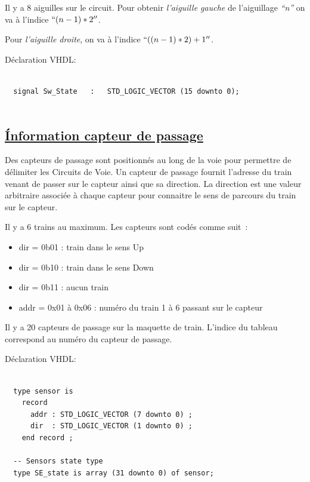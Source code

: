 \medskip

Il y a 8 aiguilles sur le circuit. Pour obtenir \emph{l'aiguille gauche} de
l'aiguillage \emph{``n''} on va à l'indice $``(n-1)*2''$.

Pour \emph{l'aiguille droite}, on va à l'indice $``((n-1)*2) + 1''$.

\bigskip

Déclaration VHDL:
\begin{lstlisting}[style=vhdl]

  signal Sw_State   :   STD_LOGIC_VECTOR (15 downto 0);
  
\end{lstlisting}


\subsection{\underline{\'Information capteur de passage}}
\label{sec:ixl_cdv}

Des capteurs de passage sont positionnés au long de la voie pour 
permettre de délimiter les Circuits de Voie. Un capteur de passage
fournit l'adresse du train venant de passer sur le capteur ainsi que
sa direction. La direction est une valeur arbitraire associée à 
chaque capteur pour connaitre le sens de parcours du train sur le capteur.


Il y a 6 trains au maximum. Les capteurs sont codés comme suit~:
\begin{itemize}
  \item dir = 0b01 : train dans le sens Up
  \item dir = 0b10 : train dans le sens Down
  \item dir = 0b11 : aucun train
  \item addr = 0x01 à 0x06 : numéro du train 1 à 6 passant sur le capteur
\end{itemize}  

Il y a 20 capteurs de passage sur la maquette de train. L'indice du
tableau correspond au numéro du capteur de passage.

\newpage

Déclaration VHDL:
\begin{lstlisting}[style=vhdl]

  type sensor is
    record
      addr : STD_LOGIC_VECTOR (7 downto 0) ;
      dir  : STD_LOGIC_VECTOR (1 downto 0) ;
    end record ;

  -- Sensors state type
  type SE_state is array (31 downto 0) of sensor;

\end{lstlisting}


